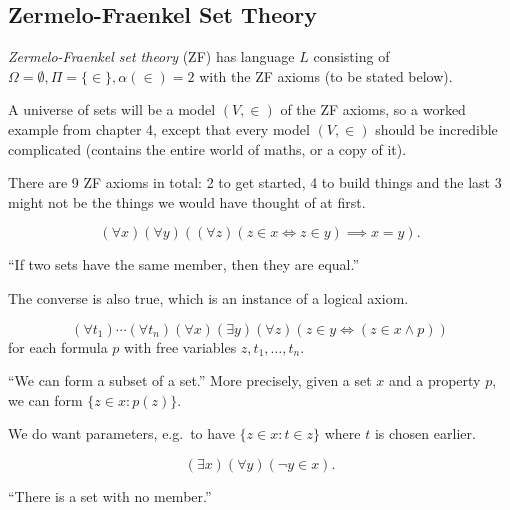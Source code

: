 \documentclass[a4paper]{article}
\begin{document}
\subsection{Zermelo-Fraenkel Set Theory}

\begin{definition}
  \emph{Zermelo-Fraenkel set theory} (ZF) has language \(L\) consisting of \(\Omega = \emptyset, \Pi = \{\in\}, \alpha(\in) = 2\) with the ZF axioms (to be stated below).
\end{definition}

A universe of sets will be a model \((V, \in)\) of the ZF axioms, so a worked example from chapter 4, except that every model \((V, \in)\) should be incredible complicated (contains the entire world of maths, or a copy of it).

There are 9 ZF axioms in total: 2 to get started, 4 to build things and the last 3 might not be the things we would have thought of at first.

\begin{axiom*}
  \[
    (\forall x) (\forall y) ((\forall z) (z \in x \iff z \in y) \implies x = y).
  \]
\end{axiom*}
``If two sets have the same member, then they are equal.''

\begin{note}
  The converse is also true, which is an instance of a logical axiom.
\end{note}

\begin{axiom*}
  \[
    (\forall t_1) \cdots (\forall t_n) (\forall x) (\exists y) (\forall z) (z \in y \iff (z \in x \land p))
  \]
  for each formula \(p\) with free variables \(z, t_1, \dots, t_n\).
\end{axiom*}
``We can form a subset of a set.'' More precisely, given a set \(x\) and a property \(p\), we can form \(\{z \in x: p(z)\}\).

\begin{note}
  We do want parameters, e.g.\ to have \(\{z \in x: t \in z\}\) where \(t\) is chosen earlier.
\end{note}

\begin{axiom*}
  \[
    (\exists x) (\forall y) (\neg y \in x).
  \]
\end{axiom*}
``There is a set with no member.''
\end{document}
